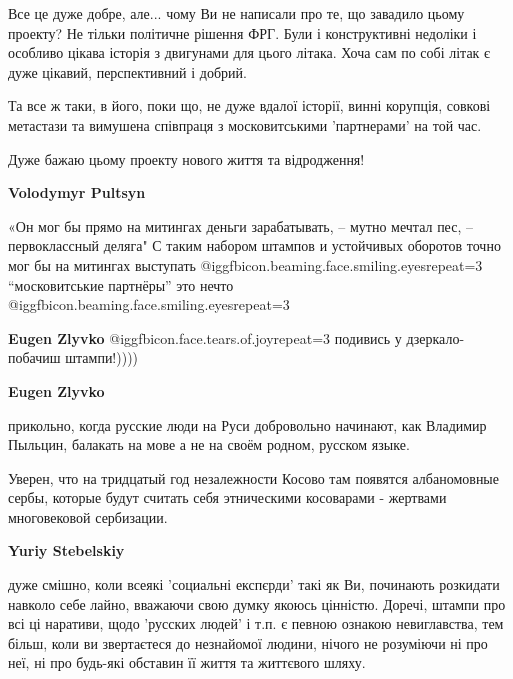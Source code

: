  
 
 
 
 
\zzSecCmt

\begin{itemize} %

Все це дуже добре, але... чому Ви не написали про те, що завадило цьому
проекту? Не тільки політичне рішення ФРГ. Були і конструктивні недоліки і
особливо цікава історія з двигунами для цього літака. Хоча сам по собі літак є
дуже цікавий, перспективний і добрий.

Та все ж таки, в його, поки що, не дуже вдалої історії, винні корупція, совкові
метастази та вимушена співпраця з московитськими 'партнерами' на той час.

Дуже бажаю цьому проекту нового життя та відродження!

\begin{itemize} %
\textbf{Volodymyr Pultsyn} 

«Он мог бы прямо на митингах деньги зарабатывать, – мутно мечтал пес, –
первоклассный деляга" С таким набором штампов и устойчивых оборотов точно мог
бы на митингах выступать  @igg{fbicon.beaming.face.smiling.eyes}{repeat=3}  \enquote{московитськие партнёры} это нечто
 @igg{fbicon.beaming.face.smiling.eyes}{repeat=3} 

\begin{itemize} %
\textbf{Eugen Zlyvko}  @igg{fbicon.face.tears.of.joy}{repeat=3}  подивись у дзеркало- побачиш штампи!))))

\textbf{Eugen Zlyvko} 

прикольно, когда русские люди на Руси добровольно начинают, как Владимир
Пыльцин, балакать на мове а не на своём родном, русском языке.

Уверен, что на тридцатый год незалежности Косово там появятся албаномовные
сербы, которые будут считать себя этническими косоварами - жертвами
многовековой сербизации.

\textbf{Yuriy Stebelskiy} 

дуже смішно, коли всеякі 'социальні експєрди' такі як Ви, починають розкидати
навколо себе лайно, вважаючи свою думку якоюсь цінністю. Доречі, штампи про всі
ці наративи, щодо 'русских людей' і т.п. є певною ознакою невиглавства, тем
більш, коли ви звертаєтеся до незнайомої людини, нічого не розуміючи ні про
неї, ні про будь-які обставин її життя та життєвого шляху.


\end{itemize}
\end{itemize}
\end{itemize}
